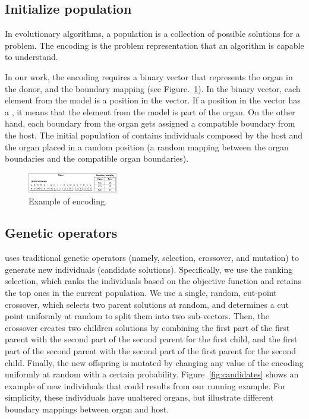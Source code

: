 \subsection{Initialize population}
In evolutionary algorithms, a population is a collection of possible solutions for a problem. The encoding is the problem representation that an algorithm is capable to understand. 

In our work, the encoding requires a binary vector that represents the organ in the donor, and the boundary mapping (see Figure.~\ref{fig:encoding}). In the binary vector, each element from the model is a position in the vector. If a position in the vector has a , it means that the element from the model is part of the organ. On the other hand, each boundary from the organ gets assigned a compatible boundary from the host.
The initial population of \ApproachName{} contains individuals composed by the host and the organ placed in a random position (\ie a random mapping between the organ boundaries and the compatible organ boundaries).

\begin{figure}[tb]
    \centering
    \includegraphics[width=0.35\textwidth]{Figures/encoding.png}
    \caption{Example of encoding.}
    \label{fig:encoding}
\end{figure}

\subsection{Genetic operators}
\ApproachName{} uses traditional genetic operators (namely, selection, crossover, and mutation) to generate new individuals (\ie candidate solutions). 
Specifically, we use the ranking selection, which ranks the individuals based on the objective function and retains the top ones in the current population. We use a single, random, cut-point crossover, which selects two parent solutions at random, and determines a cut point uniformly at random to split them into two sub-vectors. Then, the crossover creates two children solutions by combining the first part of the first parent with the second part of the second parent for the first child, and the first part of the second parent with the second part of the first parent for the second child. Finally, the new offspring is mutated by changing any value of the encoding uniformly at random with a certain probability. 
Figure~\ref{fig:candidates} shows an example of new individuals that could results from our running example. For simplicity, these individuals have unaltered organs, but illustrate different boundary mappings between organ and host.


